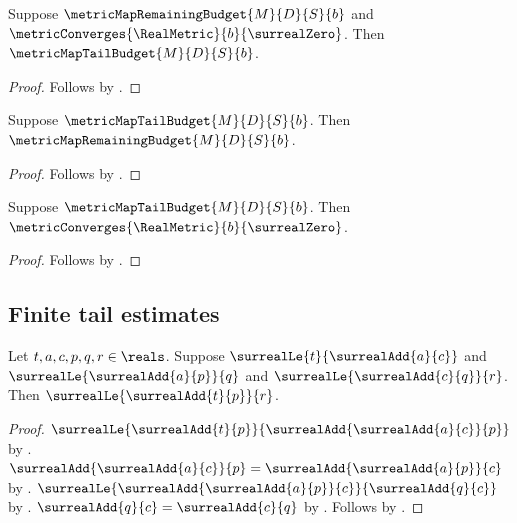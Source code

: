 \begin{proposition}\label{metric_map_tail_budget_intro}
    Suppose $\metricMapRemainingBudget{M}{D}{S}{b}$ and
        $\metricConverges{\RealMetric}{b}{\surrealZero}$.
    Then $\metricMapTailBudget{M}{D}{S}{b}$.
\end{proposition}
\begin{proof}
    Follows by .
\end{proof}

\begin{proposition}\label{metric_map_tail_budget_remaining}
    Suppose $\metricMapTailBudget{M}{D}{S}{b}$.
    Then $\metricMapRemainingBudget{M}{D}{S}{b}$.
\end{proposition}
\begin{proof}
    Follows by .
\end{proof}

\begin{proposition}\label{metric_map_tail_budget_converges_zero}
    Suppose $\metricMapTailBudget{M}{D}{S}{b}$.
    Then $\metricConverges{\RealMetric}{b}{\surrealZero}$.
\end{proposition}
\begin{proof}
    Follows by .
\end{proof}

\subsection{Finite tail estimates}

\begin{lemma}\label{real_remaining_budget_step}
    Let $t,a,c,p,q,r\in\reals$.
    Suppose $\surrealLe{t}{\surrealAdd{a}{c}}$ and
        $\surrealLe{\surrealAdd{a}{p}}{q}$ and
        $\surrealLe{\surrealAdd{c}{q}}{r}$.
    Then $\surrealLe{\surrealAdd{t}{p}}{r}$.
\end{lemma}
\begin{proof}
    $\surrealLe{\surrealAdd{t}{p}}
        {\surrealAdd{\surrealAdd{a}{c}}{p}}$
        by .
    $\surrealAdd{\surrealAdd{a}{c}}{p}
        =\surrealAdd{\surrealAdd{a}{p}}{c}$
        by
        .
    $\surrealLe{\surrealAdd{\surrealAdd{a}{p}}{c}}
        {\surrealAdd{q}{c}}$
        by .
    $\surrealAdd{q}{c}=\surrealAdd{c}{q}$
        by .
    Follows by
        .
\end{proof}

